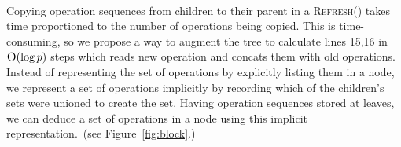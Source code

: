 \documentclass[10pt]{article}
\theoremstyle{definition}
\begin{document}
\paragraph{}
Copying operation sequences from children to their parent in a \textsc{Refresh}() takes time proportioned to the number of operations being copied. This is time-consuming, so we propose a way to augment the tree to calculate lines 15,16 in $\textsc{O}(\log p)$ steps which reads new operation and concats them with old operations. Instead of representing the set of operations by explicitly listing them in a node, we represent a set of operations implicitly by recording which of the children's sets were unioned to create the set. Having operation sequences stored at leaves, we can deduce a set of operations in a node using this implicit representation.~(see Figure~\ref{fig:block}.)
\end{document}
